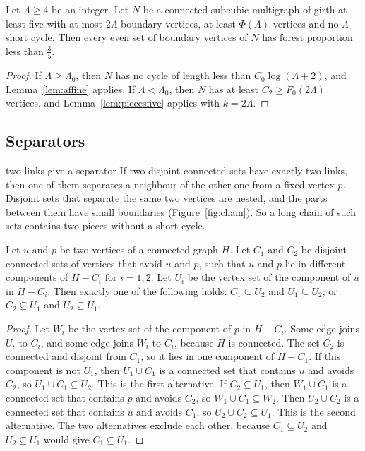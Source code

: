 \begin{corollary}[Pieces]\label{cor:pieces}
Let $\Lambda\ge4$ be an integer. Let $N$ be a connected subcubic multigraph of girth at least
five with at most $2\Lambda$ boundary vertices, at least $\Phi(\Lambda)$ vertices and no
$\Lambda$-short cycle. Then every even set of boundary vertices of $N$ has forest proportion
less than $\frac35$.
\end{corollary}

\begin{proof}
If $\Lambda\ge\Lambda_0$, then $N$ has no cycle of length less than $C_0\log(\Lambda+2)$, and
Lemma~\ref{lem:affine} applies. If $\Lambda<\Lambda_0$, then $N$ has at least
$C_2\ge F_0(2\Lambda)$ vertices, and Lemma~\ref{lem:piecesfive} applies with $k=2\Lambda$.
\end{proof}

\subsection{Separators}\label{sec:separators}

\begin{idea}{two links give a separator}
If two disjoint connected sets have exactly two links, then one of them separates a neighbour of
the other one from a fixed vertex $p$. Disjoint sets that separate the same two vertices are
nested, and the parts between them have small boundaries (Figure~\ref{fig:chain}). So a long
chain of such sets contains two pieces without a short cycle.
\end{idea}

\begin{lemma}\label{lem:nested}
Let $u$ and $p$ be two vertices of a connected graph $H$. Let $C_1$ and $C_2$ be disjoint connected
sets of vertices that avoid $u$ and $p$, such that $u$ and $p$ lie in different components of
$H-C_i$ for $i=1,2$. Let $U_i$ be the vertex set of the component of $u$ in $H-C_i$. Then exactly
one of the following holds: $C_1\subseteq U_2$ and $U_1\subseteq U_2$; or $C_2\subseteq U_1$ and
$U_2\subseteq U_1$.
\end{lemma}

\begin{proof}
Let $W_i$ be the vertex set of the component of $p$ in $H-C_i$. Some edge joins $U_i$ to $C_i$,
and some edge joins $W_i$ to $C_i$, because $H$ is connected. The set $C_2$ is connected and
disjoint from $C_1$, so it lies in one component of $H-C_1$. If this component is not $U_1$, then
$U_1\cup C_1$ is a connected set that contains $u$ and avoids $C_2$, so $U_1\cup C_1\subseteq U_2$.
This is the first alternative. If $C_2\subseteq U_1$, then $W_1\cup C_1$ is a connected set that
contains $p$ and avoids $C_2$, so $W_1\cup C_1\subseteq W_2$. Then $U_2\cup C_2$ is a connected
set that contains $u$ and avoids $C_1$, so $U_2\cup C_2\subseteq U_1$. This is the second
alternative. The two alternatives exclude each other, because
$C_1\subseteq U_2$ and $U_2\subseteq U_1$ would give $C_1\subseteq U_1$.
\end{proof}

